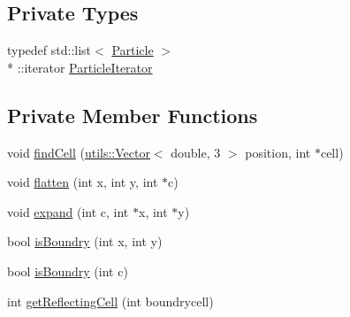 \subsection*{Private Types}
\begin{DoxyCompactItemize}
\item 
typedef std\-::list$<$ \hyperlink{classSimulation_1_1Particle}{Particle} $>$\\*
\-::iterator \hyperlink{classSimulation_1_1ParticleContainer_ac9a1b3682da81d23bd530595d41766d6}{Particle\-Iterator}
\end{DoxyCompactItemize}
\subsection*{Private Member Functions}
\begin{DoxyCompactItemize}
\item 
void \hyperlink{classSimulation_1_1ParticleContainer_aafaf96d8f9cf6ee877b0e001f46e854a}{find\-Cell} (\hyperlink{classutils_1_1Vector}{utils\-::\-Vector}$<$ double, 3 $>$ position, int $\ast$cell)
\item 
void \hyperlink{classSimulation_1_1ParticleContainer_a2d4e11b76547402b11b3bc7e018f5dfa}{flatten} (int x, int y, int $\ast$c)
\item 
void \hyperlink{classSimulation_1_1ParticleContainer_a20494365b8058fa53927dd855d8c200a}{expand} (int c, int $\ast$x, int $\ast$y)
\item 
bool \hyperlink{classSimulation_1_1ParticleContainer_a4ae3d25e9b26f8bd190e3691625cba64}{is\-Boundry} (int x, int y)
\item 
bool \hyperlink{classSimulation_1_1ParticleContainer_a67d65655ae079316295a8ac7b32aca16}{is\-Boundry} (int c)
\item 
int \hyperlink{classSimulation_1_1ParticleContainer_a6c1f20c317c9e26c1dc591048e0fe758}{get\-Reflecting\-Cell} (int boundrycell)
\end{DoxyCompactItemize}
